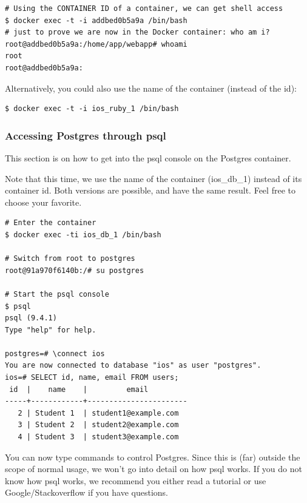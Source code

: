 \begin{verbatim}
# Using the CONTAINER ID of a container, we can get shell access
$ docker exec -t -i addbed0b5a9a /bin/bash
# just to prove we are now in the Docker container: who am i?
root@addbed0b5a9a:/home/app/webapp# whoami
root
root@addbed0b5a9a:
\end{verbatim}

Alternatively, you could also use the name of the container (instead of the id):
\begin{verbatim}
$ docker exec -t -i ios_ruby_1 /bin/bash
\end{verbatim}

\subsubsection{Accessing Postgres through psql}
This section is on how to get into the psql console on the Postgres container.

Note that this time, we use the name of the container (ios\_db\_1) instead of its container id. Both versions are possible, and have the same result. Feel free to choose your favorite.

\begin{verbatim}
# Enter the container
$ docker exec -ti ios_db_1 /bin/bash

# Switch from root to postgres
root@91a970f6140b:/# su postgres

# Start the psql console
$ psql
psql (9.4.1)
Type "help" for help.

postgres=# \connect ios
You are now connected to database "ios" as user "postgres".
ios=# SELECT id, name, email FROM users;             
 id  |    name    |         email                
-----+------------+-----------------------
   2 | Student 1  | student1@example.com
   3 | Student 2  | student2@example.com
   4 | Student 3  | student3@example.com
\end{verbatim}

You can now type commands to control Postgres. Since this is (far) outside the scope of normal usage, we won't go into detail on how psql works. If you do not know how psql works, we recommend you either read a tutorial or use Google/Stackoverflow if you have questions.

